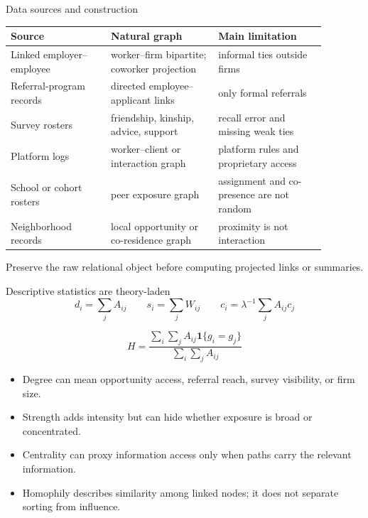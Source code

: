 \documentclass[aspectratio=169,11pt]{beamer}
\newcommand{\1}{\mathbf{1}}
\begin{document}
\begin{frame}{Data sources and construction}
\small
\begin{tabular}{p{0.28\linewidth} p{0.30\linewidth} p{0.30\linewidth}}
\toprule
Source & Natural graph & Main limitation \\
\midrule
Linked employer--employee & worker--firm bipartite; coworker projection & informal ties outside firms \\
Referral-program records & directed employee--applicant links & only formal referrals \\
Survey rosters & friendship, kinship, advice, support & recall error and missing weak ties \\
Platform logs & worker--client or interaction graph & platform rules and proprietary access \\
School or cohort rosters & peer exposure graph & assignment and co-presence are not random \\
Neighborhood records & local opportunity or co-residence graph & proximity is not interaction \\
\bottomrule
\end{tabular}

\medskip
Preserve the raw relational object before computing projected links or summaries.
\end{frame}

\begin{frame}{Descriptive statistics are theory-laden}
\small
\[
d_i=\sum_j A_{ij}
\qquad
s_i=\sum_j W_{ij}
\qquad
c_i=\lambda^{-1}\sum_j A_{ij}c_j
\]

\[
H=
\frac{\sum_i\sum_j A_{ij}\mathbf{1}\{g_i=g_j\}}
{\sum_i\sum_j A_{ij}}
\]

\begin{itemize}
    \item Degree can mean opportunity access, referral reach, survey visibility, or firm size.
    \item Strength adds intensity but can hide whether exposure is broad or concentrated.
    \item Centrality can proxy information access only when paths carry the relevant information.
    \item Homophily describes similarity among linked nodes; it does not separate sorting from influence.
\end{itemize}
\end{frame}
\end{document}
